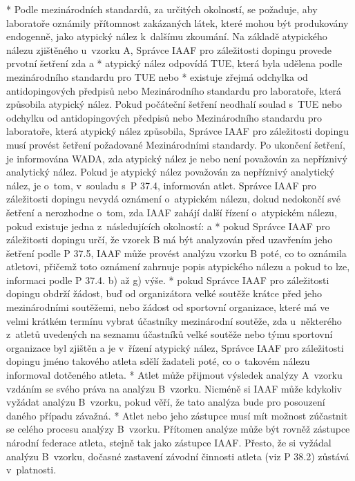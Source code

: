 * Podle mezinárodních standardů, za určitých okolností, se požaduje, aby laboratoře oznámily přítomnost zakázaných látek, které mohou být produkovány endogenně, jako atypický nález k~dalšímu zkoumání. Na základě atypického nálezu zjištěného u~vzorku A, Správce IAAF pro záležitosti dopingu provede prvotní šetření zda
  \begitems \style a
  * atypický nález odpovídá TUE, která byla udělena podle mezinárodního standardu pro TUE nebo
  * existuje zřejmá odchylka od antidopingových předpisů nebo Mezinárodního standardu pro laboratoře, která způsobila atypický nález.
  \enditems
Pokud počáteční šetření neodhalí soulad s~TUE nebo odchylku od antidopingových předpisů nebo Mezinárodního standardu pro laboratoře, která atypický nález způsobila, Správce IAAF pro záležitosti dopingu musí provést šetření požadované Mezinárodními standardy. Po ukončení šetření, je informována WADA, zda atypický nález je nebo není považován za nepříznivý analytický nález. Pokud je atypický nález považován za nepříznivý analytický nález, je o~tom, v~souladu s~P 37.4, informován atlet. Správce IAAF pro záležitosti dopingu nevydá oznámení o~atypickém nálezu, dokud nedokončí své šetření a nerozhodne o~tom, zda IAAF zahájí další řízení o~atypickém nálezu, pokud existuje jedna z~následujících okolností:
  \begitems \style a
  * pokud Správce IAAF pro záležitosti dopingu určí, že vzorek B má být analyzován před uzavřením jeho šetření podle P 37.5, IAAF může provést analýzu vzorku B poté, co to oznámila atletovi, přičemž toto oznámení zahrnuje popis atypického nálezu a pokud to lze, informaci podle P 37.4. b) až g) výše.
  * pokud Správce IAAF pro záležitosti dopingu obdrží žádost, buď od organizátora velké soutěže krátce před jeho mezinárodními soutěžemi, nebo žádost od sportovní organizace, které má ve velmi krátkém termínu vybrat účastníky mezinárodní soutěže, zda u~některého z~atletů uvedených na seznamu účastníků velké soutěže nebo týmu sportovní organizace byl zjištěn a je v~řízení atypický nález, Správce IAAF pro záležitosti dopingu jméno takového atleta sdělí žadateli poté, co o~takovém nálezu informoval dotčeného atleta.
  \enditems
* Atlet může přijmout výsledek analýzy A~vzorku vzdáním se svého práva na analýzu B~vzorku. Nicméně si IAAF může kdykoliv vyžádat analýzu B~vzorku, pokud věří, že tato analýza bude pro posouzení daného případu závažná.
* Atlet nebo jeho zástupce musí mít možnost zúčastnit se celého procesu analýzy B~vzorku. Přítomen analýze může být rovněž zástupce národní federace atleta, stejně tak jako zástupce IAAF. Přesto, že si vyžádal analýzu B~vzorku, dočasné zastavení závodní činnosti atleta (viz P 38.2) zůstává v~platnosti.
